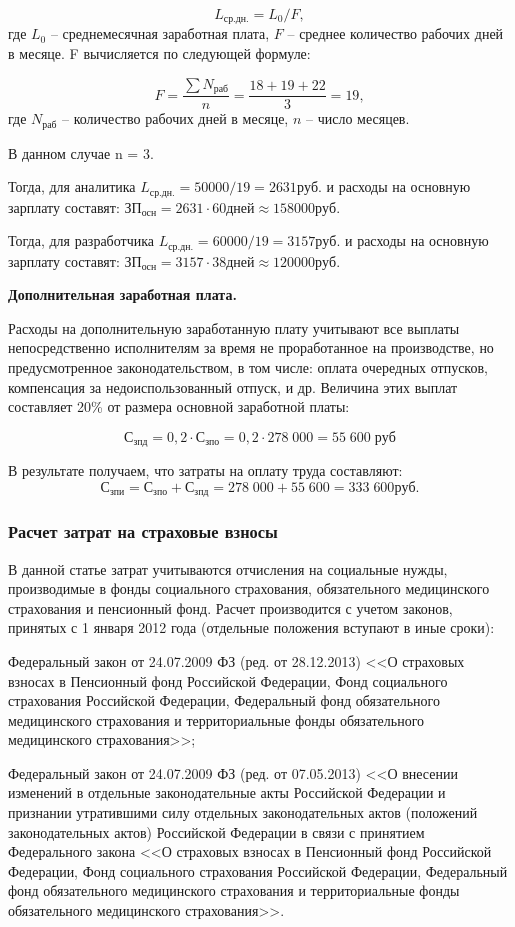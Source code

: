 $$L_{ср.дн.}=L_{0}/F,$$ 
где $L_{0}$ – среднемесячная заработная плата, $F$ – среднее количество рабочих дней в месяце. F вычисляется по следующей формуле:

$$ F = \frac{\sum N_{раб}}{n} = \frac{18+19+22}{3} = 19,$$
где $N_{раб}$ – количество рабочих дней в месяце, $n$ – число месяцев.

В данном случае n = 3.

Тогда, для аналитика $L_{ср.дн.}= 50 000 / 19 = 2 631 руб.$ и расходы на основную зарплату составят: $ЗП_{осн} = 2 631 \cdot 60 дней \approx 158 000 руб.$

Тогда, для разработчика  $ L_{ср.дн.}= 60 000 / 19 = 3 157 руб.$ и расходы на основную зарплату составят: $ЗП_{осн} = 3 157 \cdot 38 дней \approx 120 000 руб.$

\textbf{Дополнительная  заработная плата.}

Расходы на дополнительную заработанную плату учитывают все выплаты непосредственно исполнителям за время не проработанное на производстве, но предусмотренное законодательством, в том числе: оплата очередных отпусков, компенсация за недоиспользованный отпуск, и др. Величина этих выплат составляет 20\% от размера основной заработной платы:

$$С_{зпд} = 0,2 \cdot С_{зпо} = 0,2 \cdot 278\;000 = 55\;600 \; руб$$

В результате получаем, что  затраты на  оплату труда составляют:
$$С_{зпи} = С_{зпо} + С_{зпд} = 278\;000 + 55\;600 = 333\;600 руб.$$

\subsubsection{Расчет затрат на  страховые взносы}

В данной статье затрат учитываются отчисления на социальные нужды, производимые в фонды социального страхования, обязательного медицинского страхования и пенсионный фонд. Расчет производится с учетом законов, принятых с 1 января 2012 года (отдельные положения вступают в иные сроки):

Федеральный закон от 24.07.2009   ФЗ (ред. от 28.12.2013) <<О страховых взносах в Пенсионный фонд Российской Федерации, Фонд социального страхования Российской Федерации, Федеральный фонд обязательного медицинского страхования и территориальные фонды обязательного медицинского страхования>>;

Федеральный закон от 24.07.2009  ФЗ (ред. от 07.05.2013) <<О внесении изменений в отдельные законодательные акты Российской Федерации и признании утратившими силу отдельных законодательных актов (положений законодательных актов) Российской Федерации в связи с принятием Федерального закона <<О страховых взносах в Пенсионный фонд Российской Федерации, Фонд социального страхования Российской Федерации, Федеральный фонд обязательного медицинского страхования и территориальные фонды обязательного медицинского страхования>>.

